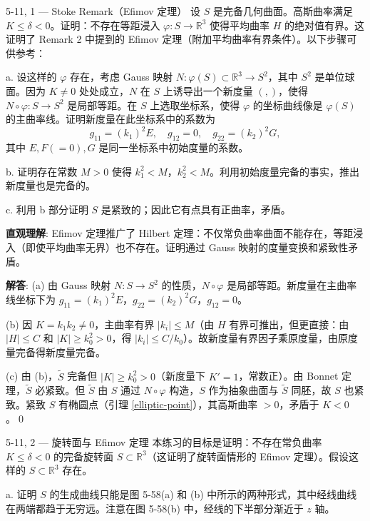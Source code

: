 \begin{Remark}
\begin{exercise}{5-11, 1 — Stoke  Remark（Efimov 定理）}
设 $S$ 是完备几何曲面。高斯曲率满足 $K \leq \delta < 0$。证明：不存在等距浸入 $\varphi \colon S \to \mathbb{R}^3$ 使得平均曲率 $H$ 的绝对值有界。这证明了 Remark 2 中提到的 Efimov 定理（附加平均曲率有界条件）。以下步骤可供参考：

a. 设这样的 $\varphi$ 存在，考虑 Gauss 映射 $N \colon \varphi(S) \subset \mathbb{R}^3 \to S^2$，其中 $S^2$ 是单位球面。因为 $K \neq 0$ 处处成立，$N$ 在 $S$ 上诱导出一个新度量 $(,)$，使得 $N \circ \varphi \colon S \to S^2$ 是局部等距。在 $S$ 上选取坐标系，使得 $\varphi$ 的坐标曲线像是 $\varphi(S)$ 的主曲率线。证明新度量在此坐标系中的系数为
\[
g_{11} = (k_1)^2 E,\quad g_{12} = 0,\quad g_{22} = (k_2)^2 G,
\]
其中 $E, F(=0), G$ 是同一坐标系中初始度量的系数。

b. 证明存在常数 $M > 0$ 使得 $k_1^2 < M$，$k_2^2 < M$。利用初始度量完备的事实，推出新度量也是完备的。

c. 利用 b 部分证明 $S$ 是紧致的；因此它有点具有正曲率，矛盾。
\end{exercise}
\begin{solution}
\textbf{直观理解}: Efimov 定理推广了 Hilbert 定理：不仅常负曲率曲面不能存在，等距浸入（即使平均曲率无界）也不存在。证明通过 Gauss 映射的度量变换和紧致性矛盾。

\textbf{解答}: (a) 由 Gauss 映射 $N: S\to S^2$ 的性质，$N\circ\varphi$ 是局部等距。新度量在主曲率线坐标下为 $g_{11}=(k_1)^2E$，$g_{22}=(k_2)^2G$，$g_{12}=0$。

(b) 因 $K=k_1k_2\neq 0$，主曲率有界 $|k_i|\leq M$（由 $H$ 有界可推出，但更直接：由 $|H|\leq C$ 和 $|K|\geq k_0^2>0$，得 $|k_i|\leq C/k_0$）。故新度量有界因子乘原度量，由原度量完备得新度量完备。

(c) 由 (b)，$\tilde{S}$ 完备但 $|K|\geq k_0^2>0$（新度量下 $K'=1$，常数正）。由 Bonnet 定理，$\tilde{S}$ 必紧致。但 $\tilde{S}$ 由 $S$ 通过 $N\circ\varphi$ 构造，$S$ 作为抽象曲面与 $\tilde{S}$ 同胚，故 $S$ 也紧致。紧致 $S$ 有椭圆点（引理 \ref{elliptic-point}），其高斯曲率 $>0$，矛盾于 $K<0$。\qed
\end{solution}

\begin{exercise}{5-11, 2 — 旋转面与 Efimov 定理}
本练习的目标是证明：不存在常负曲率 $K \leq \delta < 0$ 的完备旋转面 $S \subset \mathbb{R}^3$（这证明了旋转面情形的 Efimov 定理）。假设这样的 $S \subset \mathbb{R}^3$ 存在。

a. 证明 $S$ 的生成曲线只能是图 5-58(a) 和 (b) 中所示的两种形式，其中经线曲线在两端都趋于无穷远。注意在图 5-58(b) 中，经线的下半部分渐近于 $z$ 轴。


\end{exercise}
\end{Remark}
